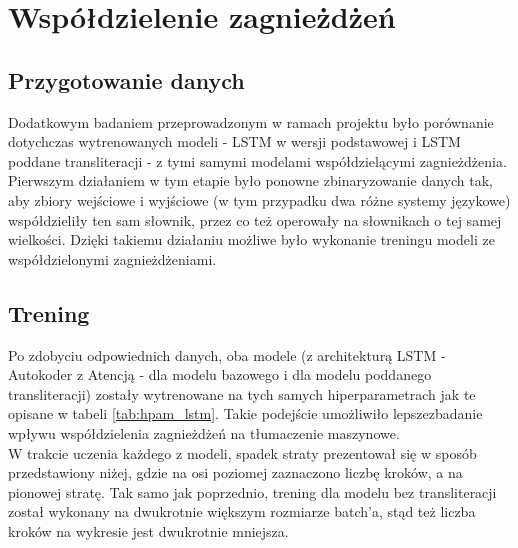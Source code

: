 \documentclass[
    left=2.5cm,         %
    right=2.5cm,        %
    top=2.5cm,          %
    bottom=3cm,         %
    bindingoffset=6mm,  %
    nohyphenation=false %
]{eiti/eiti-report}
\begin{document}
\newpage

\section{Współdzielenie zagnieżdżeń}
\subsection{Przygotowanie danych}
Dodatkowym badaniem przeprowadzonym w ramach projektu było porównanie dotychczas wytrenowanych modeli - LSTM w wersji podstawowej i LSTM poddane transliteracji - z tymi samymi modelami współdzielącymi zagnieżdżenia.\\

Pierwszym działaniem w tym etapie było ponowne zbinaryzowanie danych tak, aby zbiory wejściowe i wyjściowe (w tym przypadku dwa różne systemy językowe) współdzieliły ten sam słownik, przez co też operowały na słownikach o tej samej wielkości. Dzięki takiemu działaniu możliwe było wykonanie treningu modeli ze współdzielonymi zagnieżdżeniami.
\subsection{Trening}
Po zdobyciu odpowiednich danych, oba modele (z architekturą LSTM - Autokoder z Atencją - dla modelu bazowego i dla modelu poddanego transliteracji) zostały wytrenowane na tych samych hiperparametrach jak te opisane w tabeli \ref{tab:hpam_lstm}. Takie podejście umożliwiło \textquotesingle lepsze\textquotesingle zbadanie wpływu współdzielenia zagnieżdżeń na tłumaczenie maszynowe. \\

W trakcie uczenia każdego z modeli, spadek straty prezentował się w sposób przedstawiony niżej, gdzie na osi poziomej zaznaczono liczbę kroków, a na pionowej stratę. Tak samo jak poprzednio, trening dla modelu bez transliteracji został wykonany na dwukrotnie większym rozmiarze batch'a, stąd też liczba kroków na wykresie jest dwukrotnie mniejsza.
    
\end{document}
